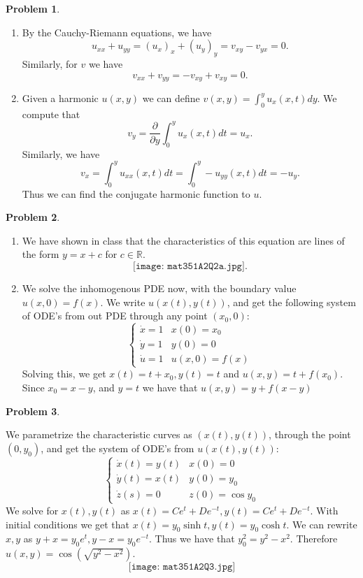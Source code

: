 \documentclass[12pt, a4paper]{article}
\title{}
\author{A.N.}
\date{\today}
\newtheorem{problem}{Problem}
\theoremstyle{definition}
\newcommand{\penum}{ \begin{enumerate}[label=\bf(\alph*), leftmargin=0pt]}
\newcommand{\epenum}{ \end{enumerate} }
\newcommand{\R}{\mathbb{R}}                           %
\begin{document}
\begin{problem}
\end{problem}
\penum
\item By the Cauchy-Riemann equations, we have 
	$$u_{xx} + u_{yy} = (u_x)_x + (u_y)_y =v_{xy} - v_{yx}=0 .$$
	Similarly, for $v$ we have
	$$v_{xx} +v_{yy} = -v_{xy} + v_{xy} = 0. $$
\item Given a harmonic $u(x,y)$ we can define $v(x,y) = \int_0^y u_x(x,t) dy$. 
	We compute that $$v_y = \frac{\partial}{\partial y} \int_0^y u_x(x,t) dt = u_x. $$
	Similarly, we have $$v_x = \int_0^y u_{xx} (x,t) dt = \int_0^y -u_{yy}(x,t) dt = -u_y.$$
	Thus we can find the conjugate harmonic function to $u$. 
\epenum
 \newpage 
\begin{problem}
\end{problem}
\penum
\item We have shown in class that the characteristics of this equation are lines of the form $y=x+c$ for $c\in \R$. 
	$$\texttt{[image: mat351A2Q2a.jpg]}.$$
\item We solve the inhomogenous PDE now, with the boundary value $u(x,0) = f(x)$. We write $u(x(t), y(t))$, and get the following system of ODE's from out PDE through any point $(x_0,0)$:
	$$\begin{cases}
		\dot{x} = 1 & x(0) = x_0\\
		\dot{y} = 1 & y(0) = 0 \\
		\dot{u} = 1 & u(x,0) = f(x)
	\end{cases}$$
Solving this, we get $x(t) = t+x_0, y(t) = t$ and $u(x,y) = t+ f(x_0)$. Since $x_0 = x-y$, and $y=t$ we have that $u(x,y) = y + f(x-y)$
\epenum
 \newpage 
\begin{problem}
\end{problem}
We parametrize the characteristic curves as $(x(t),y(t))$, through the point $(0,y_0)$, and get the system of ODE's from $u(x(t), y(t))$: 
$$\begin{cases}
	\dot{x}(t) = y(t) & x(0) = 0\\
	\dot{y}(t) = x(t) & y(0) = y_0 \\ 
	\dot{z}(s) =0 & z(0) = \cos y_0
\end{cases}$$
We solve for $x(t) ,y(t)$ as $x(t) = Ce^t + De^{-t}, y(t) = Ce^t + De^{-t}$. With initial conditions we get that $x(t) = y_0 \sinh t , y(t) = y_0 \cosh t $. We can rewrite $x,y$ as $y+x = y_0 e^t, y-x=y_0 e^{-t}$. Thus we have that $y_0^2 = y^2 - x^2$. Therefore $u(x,y) = \cos \left(\sqrt{y^2-x^2}  \right)$. 
$$\texttt{[image: mat351A2Q3.jpg]}$$
\end{document}
